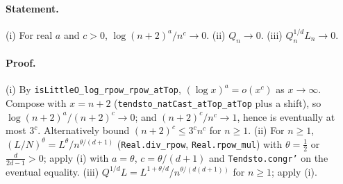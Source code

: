 \paragraph{Statement.} (i) For real $a$ and $c>0$, $\log(n+2)^a/n^c\to0$. (ii) $Q_n\to0$.
(iii) $Q_n^{1/d}L_n\to0$.
\paragraph{Proof.} (i) By \texttt{isLittleO\_log\_rpow\_rpow\_atTop}, $(\log x)^a=o(x^{c})$ as
$x\to\infty$. Compose with $x=n+2$ (\texttt{tendsto\_natCast\_atTop\_atTop} plus a shift), so
$\log(n+2)^a/(n+2)^c\to0$; and $(n+2)^c/n^c\to1$, hence is eventually at most $3^c$. Alternatively
bound $(n+2)^c\le3^cn^c$ for $n\ge1$. (ii) For $n\ge1$, $(L/N)^\theta=L^\theta/n^{\theta/(d+1)}$
(\texttt{Real.div\_rpow}, \texttt{Real.rpow\_mul}) with $\theta=\frac12$ or $\frac d{2d-1}>0$;
apply (i) with $a=\theta$, $c=\theta/(d+1)$ and \texttt{Tendsto.congr'} on the eventual equality.
(iii) $Q^{1/d}L=L^{1+\theta/d}/n^{\theta/(d(d+1))}$ for $n\ge1$; apply (i).
